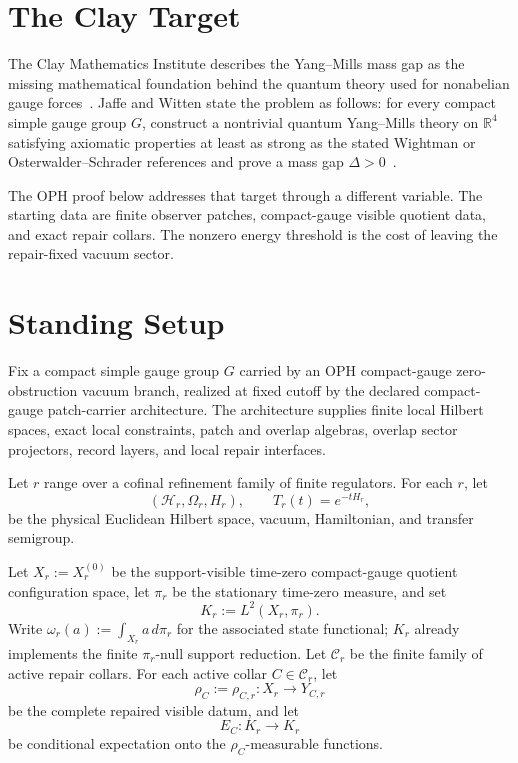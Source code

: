 \documentclass[11pt]{article}
\numberwithin{equation}{section}
\theoremstyle{remark}
\newcommand{\Hcal}{\mathcal H}
\newcommand{\R}{\mathbb R}
\begin{document}
\section{The Clay Target}

The Clay Mathematics Institute describes the Yang--Mills mass gap as the missing mathematical
foundation behind the quantum theory used for nonabelian gauge forces~\cite{clay}. Jaffe and
Witten state the problem as follows: for every compact simple gauge group \(G\), construct a
nontrivial quantum Yang--Mills theory on \(\R^4\) satisfying axiomatic properties at least as
strong as the stated Wightman or Osterwalder--Schrader references and prove a mass gap
\(\Delta>0\)~\cite{jaffe-witten,clay-mpp}.

The OPH proof below addresses that target through a different variable. The starting data are finite observer patches,
compact-gauge visible quotient data, and exact repair collars. The nonzero energy threshold is
the cost of leaving the repair-fixed vacuum sector.

\section{Standing Setup}

Fix a compact simple gauge group \(G\) carried by an OPH compact-gauge zero-obstruction vacuum
branch, realized at fixed cutoff by the declared compact-gauge patch-carrier architecture. The
architecture supplies finite local Hilbert spaces, exact local constraints, patch and overlap
algebras, overlap sector projectors, record layers, and local repair interfaces.

Let \(r\) range over a cofinal refinement family of finite regulators. For each \(r\), let
\[
(\Hcal_r,\Omega_r,H_r),
\qquad
T_r(t)=e^{-tH_r},
\]
be the physical Euclidean Hilbert space, vacuum, Hamiltonian, and transfer semigroup.

Let \(X_r:=X_r^{(0)}\) be the support-visible time-zero compact-gauge quotient configuration
space, let \(\pi_r\) be the stationary time-zero measure, and set
\[
K_r:=L^2(X_r,\pi_r).
\]
Write \(\omega_r(a):=\int_{X_r}a\,d\pi_r\) for the associated state functional; \(K_r\) already
implements the finite \(\pi_r\)-null support reduction.
Let \(\mathcal C_r\) be the finite family of active repair collars. For each active collar
\(C\in\mathcal C_r\), let
\[
\rho_C:=\rho_{C,r}:X_r\to Y_{C,r}
\]
be the complete repaired visible datum, and let
\[
E_C:K_r\to K_r
\]
be conditional expectation onto the \(\rho_C\)-measurable functions.
\end{document}

